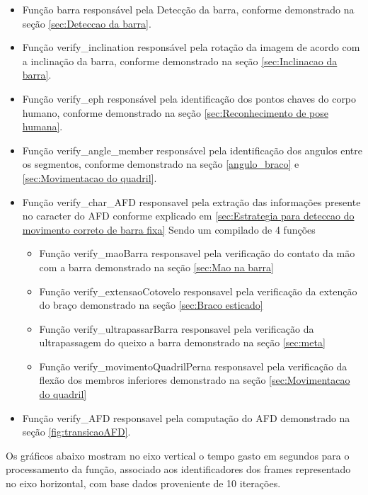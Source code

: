 \begin{itemize}
	\item Função barra responsável pela Detecção da barra, conforme demonstrado na seção \ref{sec:Deteccao da barra}.

	\item Função verify\_inclination responsável pela rotação da imagem de acordo com a inclinação da barra, conforme demonstrado na seção \ref{sec:Inclinacao da barra}.

	\item Função verify\_eph responsável pela identificação dos pontos chaves do corpo humano, conforme demonstrado na seção \ref{sec:Reconhecimento de pose humana}.

	\item Função verify\_angle\_member responsável pela identificação dos angulos entre os segmentos, conforme demonstrado na seção \ref{angulo_braco} e \ref{sec:Movimentacao do quadril}. 

	\item Função verify\_char\_AFD responsavel pela extração das informações presente no caracter do \ac{AFD} conforme explicado em \ref{sec:Estrategia para deteccao do movimento correto de barra fixa} Sendo um compilado de 4 funções 
	
	\begin{itemize}
		
		\item Função verify\_maoBarra responsavel pela verificação do contato da mão com a barra demonstrado na seção \ref{sec:Mao na barra}
		\item Função verify\_extensaoCotovelo responsavel pela verificação da extenção do braço demonstrado na seção \ref{sec:Braco esticado}
		\item Função verify\_ultrapassarBarra responsavel pela verificação da ultrapassagem do queixo a barra demonstrado na seção \ref{sec:meta} 
		\item Função verify\_movimentoQuadrilPerna responsavel pela verificação da flexão dos membros inferiores demonstrado na seção \ref{sec:Movimentacao do quadril}

	\end{itemize}

	\item Função verify\_AFD responsavel pela computação do \ac{AFD} demonstrado na seção \ref{fig:transicaoAFD}.

\end{itemize}

Os gráficos abaixo mostram no eixo vertical o tempo gasto em segundos para o processamento da função, associado aos identificadores dos frames representado no eixo horizontal, com  base dados proveniente de 10 iterações.


